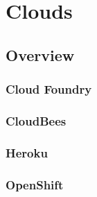 \part{Clouds}


\chapter{Overview}



\section{Cloud Foundry}



\section{CloudBees}



\section{Heroku}


\section{OpenShift}



